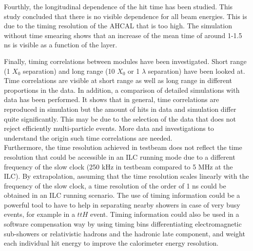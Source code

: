Fourthly, the longitudinal dependence of the hit time has been studied. This study concluded that there is no visible dependence for all beam energies. This is due to the timing resolution of the AHCAL that is too high. The simulation without time smearing shows that an increase of the mean time of around 1-1.5 ns is visible as a function of the layer.

Finally, timing correlations between modules have been investigated. Short range (1 $X_0$ separation) and long range (10 $X_0$ or 1 $\lambda$ separation) have been looked at. Time correlations are visible at short range as well as long range in different proportions in the data. In addition, a comparison of detailed simulations with data has been performed. It shows that in general, time correlations are reproduced in simulation but the amount of hits in data and simulation differ quite significantly. This may be due to the selection of the data that does not reject efficiently multi-particle events. More data and investigations to understand the origin such time correlations are needed.\\[0.1cm]

Furthermore, the time resolution achieved in testbeam does not reflect the time resolution that could be accessible in an ILC running mode due to a different frequency of the slow clock (250 kHz in testbeam compared to 5 MHz at the ILC). By extrapolation, assuming that the time resolution scales linearly with the frequency of the slow clock, a time resolution of the order of 1 ns could be obtained in an ILC running scenario. The use of timing information could be a powerful tool to have to help in separating nearby showers in case of very busy events, for example in a $ttH$ event. Timing information could also be used in a software compensation way by using timing bins differentiating electromagnetic sub-showers or relativistic hadrons and the hadronic late component, and weight each individual hit energy to improve the calorimeter energy resolution.
